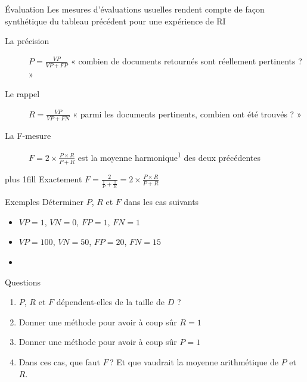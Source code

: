 \documentclass[hyperref={unicode}, xcolor={svgnames}, french]{beamer}
\begin{document}
\begin{frame}{Évaluation}
    Les mesures d'évaluations usuelles rendent compte de façon synthétique du tableau précédent pour une expérience de RI
    \begin{description}
        \item[La précision] $P=\frac{VP}{VP+FP}$ « combien de documents retournés sont réellement pertinents ? »
        \item[Le rappel] $R=\frac{VP}{VP+FN}$ « parmi les documents pertinents, combien ont été trouvés ? »
        \item[La F-mesure] $F=2×\frac{P×R}{P+R}$ est la moyenne harmonique\textsuperscript{1} des deux précédentes
    \end{description}
    \vskip0pt plus 1fill
    {\tiny Exactement $F=\frac{2}{\frac{1}{P}+\frac{1}{R}}=2×\frac{P×R}{P+R}$}
\end{frame}

\begin{frame}[fragile=singleslide]{Exemples}
    Déterminer $P$, $R$ et $F$ dans les cas suivants
    \begin{itemize}
        \item $VP=1$, $VN=0$, $FP=1$, $FN=1$
        \item $VP=100$, $VN=50$, $FP=20$, $FN=15$
        \item \mbox{}\\
            {
                \tikzset{external/export=true}
            }
    \end{itemize}
\end{frame}

\begin{frame}{Questions}
    \begin{enumerate}
        \item $P$, $R$ et $F$ dépendent-elles de la taille de $D$ ?
        \item Donner une méthode pour avoir à coup sûr $R=1$
        \item Donner une méthode pour avoir à coup sûr $P=1$
        \item Dans ces cas, que faut $F$ ? Et que vaudrait la moyenne arithmétique de $P$ et $R$.
    \end{enumerate}
\end{frame}
\end{document}

